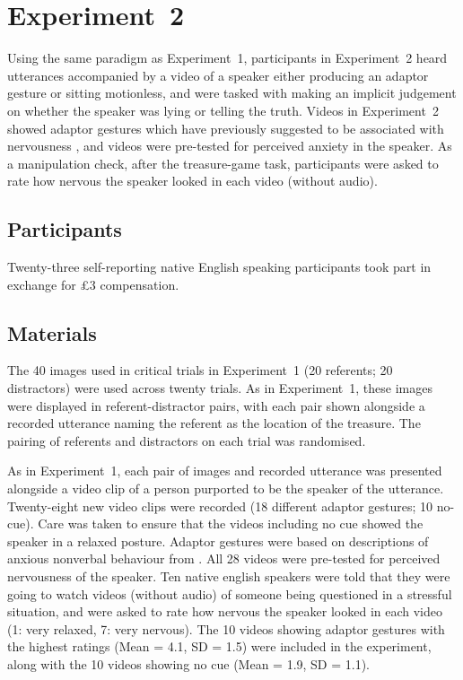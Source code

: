 \documentclass[a4paper,man,natbib]{apa6}
\begin{document}
\section{Experiment~2}
Using the same paradigm as Experiment~1, participants in Experiment~2 heard utterances accompanied by a video of a speaker either producing an adaptor gesture or sitting motionless, and were tasked with making an implicit judgement on whether the speaker was lying or telling the truth.
Videos in Experiment~2 showed adaptor gestures which have previously suggested to be associated with nervousness \citep[See][]{Gregersen2005}, and videos were pre-tested for perceived anxiety in the speaker.
As a manipulation check, after the treasure-game task, participants were asked to rate how nervous the speaker looked in each video (without audio).

\subsection{Participants}
Twenty-three self-reporting native English speaking participants took part in exchange for \pounds{}3 compensation.

\subsection{Materials}
The 40 images used in critical trials in Experiment~1 (20 referents; 20 distractors) were used across twenty trials.
As in Experiment~1, these images were displayed in referent-distractor pairs, with each pair shown alongside a recorded utterance naming the referent as the location of the treasure.
The pairing of referents and distractors on each trial was randomised.

As in Experiment~1, each pair of images and recorded utterance was presented alongside a video clip of a person purported to be the speaker of the utterance.
Twenty-eight new video clips were recorded (18 different adaptor gestures; 10 no-cue). 
Care was taken to ensure that the videos including no cue showed the speaker in a relaxed posture. 
Adaptor gestures were based on descriptions of anxious nonverbal behaviour from \citet{Gregersen2005}.
All 28 videos were pre-tested for perceived nervousness of the speaker.
Ten native english speakers were told that they were going to watch videos (without audio) of someone being questioned in a stressful situation, and were asked to rate how nervous the speaker looked in each video (1: very relaxed, 7: very nervous). 
The 10 videos showing adaptor gestures with the highest ratings (Mean = 4.1, SD = 1.5) were included in the experiment, along with the 10 videos showing no cue (Mean = 1.9, SD = 1.1).
\end{document}
